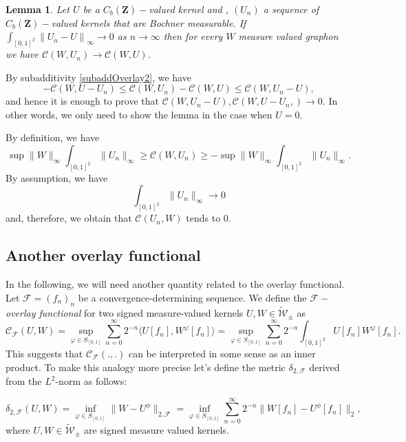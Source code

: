 \documentclass[11pt]{article}
\newtheorem{lemma}[theorem]{Lemma}
\newcommand{\cF}{{\mathcal F}}  %
\newcommand{\Space}{\mathbf{Z}}
\newcommand{\signed}{\pm}
\newcommand{\CbFunct}{C_b(\Space)}
\newcommand{\UKernel}{\widetilde{\mathcal{W}}_{\signed}}
\begin{document}
\begin{lemma}\label{continuityContBoundGraphL1}
Let $U$ be a $\CbFunct-$valued kernel and , $(U_n)$ a sequence of $\CbFunct-$valued kernels that are Bochner measurable. If $\int_{[0,1]^2}\left\|U_n- U\right\|_{\infty} \rightarrow 0$ as $n \rightarrow \infty$ then for every $W $ measure valued graphon we have $\mathcal{C}\left( W,U_n\right) \rightarrow \mathcal{C}(W,U)$.
\end{lemma}
\proof
By subadditivity \eqref{subaddOverlay2}, we have
$$
-\mathcal{C}\left(W,U-U_n\right) \leq \mathcal{C}\left(W,U_n\right)-\mathcal{C}(W,U) \leq \mathcal{C}\left(W,U_n-U\right),
$$
and hence it is enough to prove that $\mathcal{C}\left(W,U_n-U\right), \mathcal{C}\left(W,U-U_n, \right) \rightarrow 0$. In other words, we only need to show the lemma in the case when $U=0$.

By definition, we have $$\sup\|W\|_{\infty}\int_{[0,1]^{2}}\|U_n\|_{\infty}\geq \mathcal{C}(W,U_n)\geq -\sup\|W\|_{\infty}\int_{[0,1]^{2}}\|U_n\|_{\infty}.$$ By assumption, we have $$
\int_{[0,1]^{2}}\|U_n\|_{\infty}\rightarrow 0
$$
and, therefore, we obtain that $\mathcal{C}(U_n,W)$ tends to $0.$
\endproof

\subsection{Another overlay functional}
In the following, we will need another quantity related to the overlay functional.  Let $\mathcal{F}=(f_n)_n$ be a convergence-determining sequence. We define the $\cF-$\emph{overlay functional} for two signed measure-valued kernels $U,W\in\UKernel$ as
$$
\mathcal{C}_{\mathcal{F}}(U,W)=\sup_{{\varphi \in S_{[0,1]}}}\sum^{\infty}_{n=0}2^{-n}\langle U[f_n],W^{\varphi}[f_n]\rangle=\sup_{{\varphi \in S_{[0,1]}}}\sum^{\infty}_{n=0}2^{-n}\int_{[0,1]^2}U[f_n]W^{\varphi}[f_n].
$$
This suggests that $\mathcal{C}_{\mathcal{F}}(.,.)$ can be interpreted in some sense as an inner product. To make this analogy more precise let's define the metric $\delta_{2,\mathcal{F}}$ derived from the $L^2$-norm as follows: 

$$
\delta_{2,\mathcal{F}}(U,W)=\inf_{ {\varphi \in S_{[0,1]}}}\|W-U^{\phi}\|_{2,\mathcal{F}}=\inf_{ {\varphi \in S_{[0,1]}}}\sum^{\infty}_{n=0}2^{-n}\|W[f_n]-U^{\phi}[f_n]\|_2,
$$
where $U,W\in \UKernel$ are signed measure valued kernels. 
\end{document}
